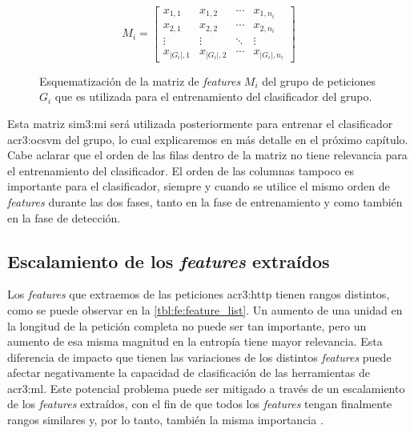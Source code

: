 \begin{figure}[ht]
    $$
    M_{i} =
    \begin{bmatrix}
        x_{1,1}                    & x_{1,2}                    & \cdots & x_{1,n_{i}} \\
        x_{2,1}                    & x_{2,2}                    & \cdots & x_{2,n_{i}} \\
        \vdots                     & \vdots                     & \ddots & \vdots      \\
        x_{\lvert G_{i} \rvert, 1} & x_{\lvert G_{i} \rvert, 2} & \cdots & x_{\lvert G_{i} \rvert, n_{i}}
    \end{bmatrix}
    $$

    \caption{Esquematización de la matriz de \textit{features} $M_{i}$ del
        grupo de peticiones $G_{i}$ que es utilizada para el entrenamiento
        del clasificador del grupo.}
    \label{fig:fe:matrix_m}
\end{figure}

Esta matriz \gls{sim3:mi} será utilizada posteriormente para entrenar el
clasificador \gls{acr3:ocsvm} del grupo, lo cual explicaremos en más
detalle en el próximo capítulo. Cabe aclarar que el orden de las filas
dentro de la matriz no tiene relevancia para el entrenamiento del clasificador.
El orden de las columnas tampoco es importante para el clasificador,
siempre y cuando se utilice el mismo orden de \textit{features} durante
las dos fases, tanto en la fase de entrenamiento y como también en la
fase de detección.


\subsection{Escalamiento de los \textit{features} extraídos}

Los \textit{features} que extraemos de las peticiones \gls{acr3:http}
tienen rangos distintos, como se puede observar en la
\autoref{tbl:fe:feature_list}.
Un aumento de una unidad en la longitud de la petición completa no puede
ser tan importante, pero un aumento de esa misma magnitud en la entropía
tiene mayor relevancia. Esta diferencia de impacto que tienen las variaciones
de los distintos \textit{features} puede afectar negativamente la capacidad
de clasificación de las herramientas de \gls{acr3:ml}. Este potencial
problema puede ser mitigado a través de un escalamiento de los \textit{features}
extraídos, con el fin de que todos los \textit{features} tengan finalmente
rangos similares y, por lo tanto, también la misma importancia
\citep{rieck2009machine}. %


